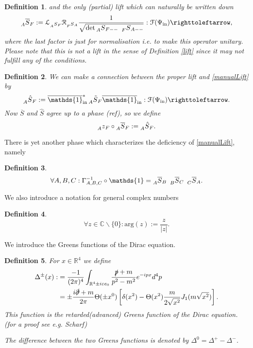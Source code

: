 \documentclass[oneside,reqno,12pt]{amsart}
\newtheorem{Def}{Definition}[section]
\begin{document}
\begin{Def}
and the only (partial) lift which can naturally be written down
\begin{equation}\label{manualLift}
\prescript{}{A}{\overline{S}}_{F}:=\mathcal{L}_{\prescript{}{A}{S}_{F}}\mathcal{R}_{\prescript{}{F}{S}_{A}} 
\frac{1}{\sqrt{\det \prescript{}{A}{S}_{F --} ~\prescript{}{F}{S}_{A --}}}:\mathcal{F}(\Psi_{\text{in}})\righttoleftarrow,
\end{equation}
where the last factor is just for normalisation i.e. to make this operator unitary. Please note that this is not a lift in the sense of Definition \ref{lift} since it may not fulfill any of the conditions.
\end{Def}

\begin{Def}
We can make a connection between the proper lift and \eqref{manualLift} by
\begin{equation}
\prescript{}{A}{\hat{S}}_F:= \overline{\mathds{1}}_{\text{in}}^* \prescript{}{A}{\tilde{S}}_{F} \overline{\mathds{1}}_{\text{in}}:\mathcal{F}(\Psi_{\text{in}})\righttoleftarrow.
\end{equation}
Now \(\overline{S}\) and \(\hat{S}\) agree up to a phase (ref), so we define
\begin{equation}\label{def:z}
\prescript{}{A}{z}_{F} \circ \prescript{}{A}{\overline{S}}_{F} := \prescript{}{A}{\hat{S}}_{F}.
\end{equation} 
\end{Def}
There is yet another phase which characterizes the deficiency of \eqref{manualLift}, namely
\begin{Def}
\begin{equation}\label{def:gamma}
\forall A,B,C: \Gamma^{-1}_{A,B,C} \circ \mathds{1} = \prescript{}{A}{\overline{S}}_B ~ \prescript{}{B}{\overline{S}}_C ~ \prescript{}{C}{\overline{S}}_A.
\end{equation}
\end{Def}

We also introduce a notation for  general complex numbers
\begin{Def}
\begin{equation}
\forall z\in\mathbb{C}\backslash \{0\}: \text{arg}(z) := \frac{z}{|z|}.
\end{equation}
\end{Def}

We introduce the Greens functions of the Dirac equation.
\begin{Def}
For \(x\in\mathbb{R}^4\) we define
\begin{align}
\Delta^\pm (x):&= \frac{-1}{(2\pi)^4} \int_{\mathbb{R}^4 \pm i \varepsilon e_0} \frac{\slashed{p}+m}{p^2-m^2} e^{-ip x} d^4 p \\
&=\pm \frac{i \slashed{\partial} +m}{2\pi} \Theta(\pm x^0) \left[ \delta(x^2) - \Theta (x^2) \frac{m}{2 \sqrt{x^2}} J_1 (m \sqrt{x^2})\right].
\end{align}
This function is the retarded(advanced) Greens function of the Dirac equation. (for a proof see e.g. Scharf)

The difference between the two Greens functions is denoted by \(\Delta^{0}=\Delta^+-\Delta^-\).
\end{Def}
\end{document}
